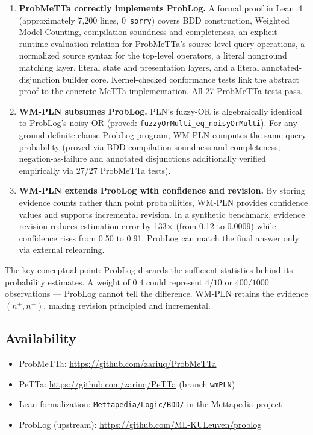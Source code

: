 \documentclass[11pt,a4paper]{article}
\theoremstyle{definition}
\begin{document}
\begin{enumerate}
\item \textbf{ProbMeTTa correctly implements ProbLog.}
A formal proof in Lean~4 (approximately 7{,}200 lines, 0~\texttt{sorry}) covers BDD
construction, Weighted Model Counting, compilation soundness and
completeness, an explicit runtime evaluation relation for
ProbMeTTa's source-level query operations, a normalized source syntax for the
top-level operators, a literal nonground matching layer, literal state and
presentation layers, and a literal annotated-disjunction builder core.
Kernel-checked conformance tests link the abstract proof to the concrete MeTTa
implementation. All 27 ProbMeTTa tests pass.

\item \textbf{WM-PLN subsumes ProbLog.}
PLN's fuzzy-OR is algebraically identical to ProbLog's noisy-OR
(proved: \texttt{fuzzyOrMulti\_eq\_noisyOrMulti}). For any ground definite
clause ProbLog program, WM-PLN computes the same query probability
(proved via BDD compilation soundness and completeness; negation-as-failure
and annotated disjunctions additionally verified empirically via 27/27
ProbMeTTa tests).

\item \textbf{WM-PLN extends ProbLog with confidence and revision.}
By storing evidence counts rather than point probabilities, WM-PLN
provides confidence values and supports incremental revision.
In a synthetic benchmark, evidence revision reduces estimation error
by 133$\times$ (from 0.12 to 0.0009) while confidence rises from 0.50
to 0.91. ProbLog can match the final answer only via external relearning.
\end{enumerate}

The key conceptual point: ProbLog discards the sufficient statistics
behind its probability estimates. A weight of $0.4$ could represent
$4/10$ or $400/1000$ observations --- ProbLog cannot tell the difference.
WM-PLN retains the evidence $(n^+, n^-)$, making revision principled
and incremental.

\subsection*{Availability}

\begin{itemize}
\item ProbMeTTa: \url{https://github.com/zariuq/ProbMeTTa}
\item PeTTa: \url{https://github.com/zariuq/PeTTa} (branch \texttt{wmPLN})
\item Lean formalization: \texttt{Mettapedia/Logic/BDD/} in the Mettapedia project
\item ProbLog (upstream): \url{https://github.com/ML-KULeuven/problog}
\end{itemize}
\end{document}
